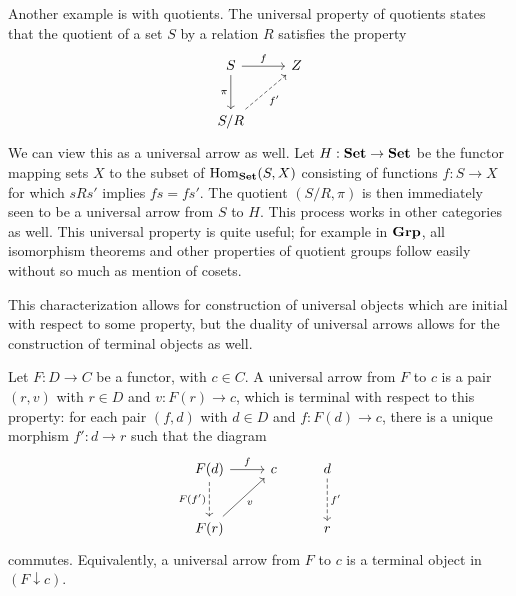 Another example is with quotients. The universal property of quotients states that the quotient of a set $S$ by a relation $R$ satisfies the property
\[\begin{tikzcd}[row sep = 2.5em, column sep = 2.5em]
S\ar[" \pi  "', d] \ar[" f ", r]  & Z \\
S/R\ar[" f' "', dashed, ur]  & 
\end{tikzcd}\]
We can view this as a universal arrow as well. Let $H : \mathbf{Set}  \to \mathbf{Set} $ be the functor mapping sets $X$ to the subset of $\operatorname{Hom}_{\mathbf{Set} }(S, X) $ consisting of functions $f : S \to X$ for which $sRs'$ implies $fs=fs'$. The quotient $(S/R,\pi )$ is then immediately seen to be a universal arrow from $S$ to $H$. This process works in other categories as well. This universal property is quite useful; for example in $\mathbf{Grp} $, all isomorphism theorems and other properties of quotient groups follow easily without so much as mention of cosets.

This characterization allows for construction of universal objects which are initial with respect to some property, but the duality of universal arrows allows for the construction of terminal objects as well.

\begin{definition}\label{dfn:3.2}
	Let $F : D \to C$ be a functor, with $c\in C$. A universal arrow from $F$ to $c$ is a pair $(r,v)$ with $r\in D$ and $v : F(r) \to c$, which is terminal with respect to this property: for each pair $(f,d)$ with $d\in D$ and $f : F(d) \to c$, there is a unique morphism $f': d \to r$ such that the diagram
	\[\begin{tikzcd}[row sep = 2.5em, column sep = 2.5em]
	F(d)\ar[" f ", r] \ar[" F(f') "', dashed, d]  & c & d\ar[" f' ", dashed, d]  \\
	F(r)\ar[" v "', ur]  &  & r
	\end{tikzcd}\]
	commutes. Equivalently, a universal arrow from $F$ to $c$ is a terminal object in $(F\downarrow c)$.
\end{definition}

